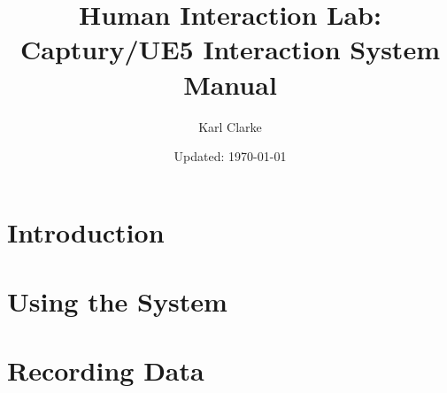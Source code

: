 \documentclass{report}
\title{Human Interaction Lab: Captury/UE5 Interaction System Manual}
\author{Karl Clarke}
\date{Updated: \today}
\begin{document}
\maketitle
\tableofcontents

\onehalfspacing %


\chapter{Introduction}


\chapter{Using the System}

\chapter{Recording Data}

\end{document}
